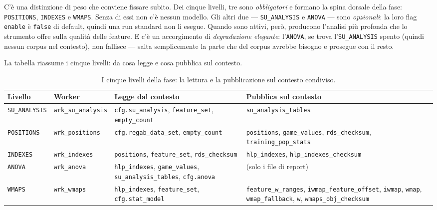 C'è una distinzione di peso che conviene fissare subito. Dei cinque livelli,
tre sono \emph{obbligatori} e formano la spina dorsale della fase:
\texttt{POSITIONS}, \texttt{INDEXES} e \texttt{WMAPS}. Senza di essi non c'è
nessun modello. Gli altri due — \texttt{SU\_ANALYSIS} e \texttt{ANOVA} — sono
\emph{opzionali}: la loro flag \texttt{enable} è \texttt{false} di default,
quindi una run standard non li esegue. Quando sono attivi, però, producono
l'analisi più profonda che lo strumento offre sulla qualità delle feature. E
c'è un accorgimento di \emph{degradazione elegante}: l'\texttt{ANOVA}, se
trova l'\texttt{SU\_ANALYSIS} spento (quindi nessun corpus nel contesto), non
fallisce — salta semplicemente la parte che del corpus avrebbe bisogno e
prosegue con il resto.

La tabella riassume i cinque livelli: da cosa legge e cosa pubblica sul
contesto.

\begin{table}[htbp]
\centering
\small
\begin{tabularx}{\textwidth}{@{}llXX@{}}
\toprule
Livello & Worker & Legge dal contesto & Pubblica sul contesto \\
\midrule
\texttt{SU\_ANALYSIS} & \texttt{wrk\_su\_analysis} & \texttt{cfg.su\_analysis}, \texttt{feature\_set}, \texttt{empty\_count} & \texttt{su\_analysis\_tables} \\
\texttt{POSITIONS}    & \texttt{wrk\_positions}     & \texttt{cfg.regab\_data\_set}, \texttt{empty\_count} & \texttt{positions}, \texttt{game\_values}, \texttt{rds\_checksum}, \texttt{training\_pop\_stats} \\
\texttt{INDEXES}      & \texttt{wrk\_indexes}       & \texttt{positions}, \texttt{feature\_set}, \texttt{rds\_checksum} & \texttt{hlp\_indexes}, \texttt{hlp\_indexes\_checksum} \\
\texttt{ANOVA}        & \texttt{wrk\_anova}         & \texttt{hlp\_indexes}, \texttt{game\_values}, \texttt{su\_analysis\_tables}, \texttt{cfg.anova} & (solo i file di report) \\
\texttt{WMAPS}        & \texttt{wrk\_wmaps}         & \texttt{hlp\_indexes}, \texttt{feature\_set}, \texttt{cfg.stat\_model} & \texttt{feature\_w\_ranges}, \texttt{iwmap\_feature\_offset}, \texttt{iwmap}, \texttt{wmap}, \texttt{wmap\_fallback}, \texttt{w}, \texttt{wmaps\_obj\_checksum} \\
\bottomrule
\end{tabularx}
\caption{I cinque livelli della fase: la lettura e la pubblicazione sul contesto condiviso.}
\label{tab:corpus-levels}
\end{table}

